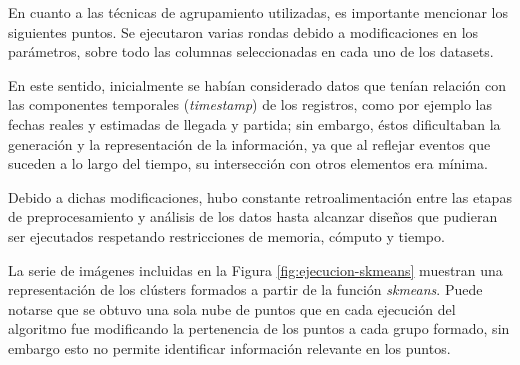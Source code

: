 \documentclass[12pt]{article}
\numberwithin{equation}{section}
\numberwithin{table}{section}
\numberwithin{figure}{section}
\begin{document}
En cuanto a las técnicas de agrupamiento utilizadas, es importante mencionar los siguientes puntos.
Se ejecutaron varias rondas debido a modificaciones en los parámetros, sobre todo las columnas seleccionadas en cada uno de los datasets.

En este sentido, inicialmente se habían considerado datos que tenían relación con las componentes temporales (\emph{timestamp}) de los registros, como por ejemplo las fechas reales y estimadas de llegada y partida; sin embargo, éstos dificultaban la generación y la representación de la información, ya que al reflejar eventos que suceden a lo largo del tiempo, su intersección con otros elementos era mínima.

Debido a dichas modificaciones, hubo constante retroalimentación entre las etapas de preprocesamiento y análisis de los datos hasta alcanzar diseños que pudieran ser ejecutados respetando restricciones de memoria, cómputo y tiempo.

La serie de imágenes incluidas en la Figura \ref{fig:ejecucion-skmeans} muestran una representación de los clústers formados a partir de la función \emph{skmeans}.
Puede notarse que se obtuvo una sola nube de puntos que en cada ejecución del algoritmo fue modificando la pertenencia de los puntos a cada grupo formado, sin embargo esto no permite identificar información relevante en los puntos.
\end{document}
